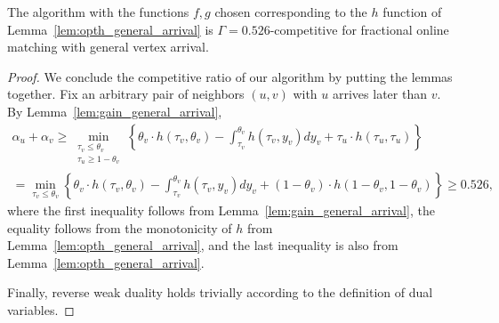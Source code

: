 \begin{theorem}
The algorithm with the functions $f,g$ chosen corresponding to the $h$ function of Lemma~\ref{lem:opth_general_arrival} is $\Gamma = 0.526$-competitive for fractional online matching with general vertex arrival.
\end{theorem}
\begin{proof}
We conclude the competitive ratio of our algorithm by putting the lemmas together. Fix an arbitrary pair of neighbors $(u,v)$ with $u$ arrives later than $v$. By Lemma~\ref{lem:gain_general_arrival},
\begin{multline*}
\alpha_u + \alpha_v \ge \min_{\substack{\tau_v \le \theta_v \\ \tau_u \ge 1-\theta_v}} \left\{ \theta_v \cdot h(\tau_v, \theta_v) - \int_{\tau_v}^{\theta_v} h(\tau_v, y_v) dy_v + \tau_u \cdot h(\tau_u,\tau_u) \right\} \\
= \min_{\tau_v \le \theta_v} \left\{ \theta_v \cdot h(\tau_v, \theta_v) - \int_{\tau_v}^{\theta_v} h(\tau_v, y_v) dy_v + (1-\theta_v) \cdot h(1-\theta_v,1-\theta_v) \right\} \ge 0.526,
\end{multline*}
where the first inequality follows from Lemma~\ref{lem:gain_general_arrival}, the equality follows from the monotonicity of $h$ from Lemma~\ref{lem:opth_general_arrival}, and the last inequality is also from Lemma~\ref{lem:opth_general_arrival}.

Finally, reverse weak duality holds trivially according to the definition of dual variables.
\end{proof}

